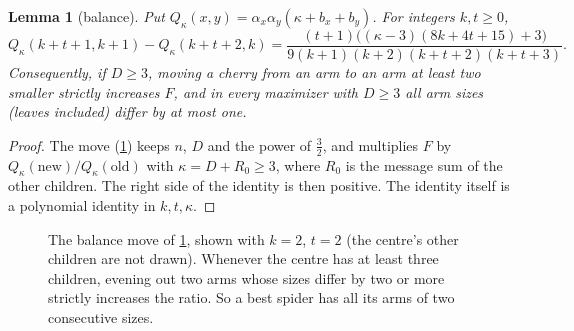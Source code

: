 \documentclass[11pt]{article}
\newtheorem{lemma}[theorem]{Lemma}
\theoremstyle{definition}
\begin{document}
\begin{lemma}[balance]\label{lem:balance}
Put $Q_\kappa(x,y)=\alpha_x\alpha_y(\kappa+b_x+b_y)$. For integers $k,t\ge0$,
\[
  Q_\kappa(k+t+1,k+1)-Q_\kappa(k+t+2,k)=\frac{(t+1)\big((\kappa-3)(8k+4t+15)+3\big)}{9(k+1)(k+2)(k+t+2)(k+t+3)}.
\]
Consequently, if $D\ge3$, moving a cherry from an arm to an arm at least two smaller strictly increases
$F$, and in every maximizer with $D\ge3$ all arm sizes (leaves included) differ by at most one.
\end{lemma}

\begin{proof}
The move (\cref{fig:balance}) keeps $n$, $D$ and the power of $\tfrac32$, and multiplies $F$ by
$Q_\kappa(\text{new})/Q_\kappa(\text{old})$ with $\kappa=D+R_0\ge3$, where $R_0$ is the message sum of the
other children. The right side of the identity is then positive. The identity itself is a polynomial
identity in $k,t,\kappa$.
\end{proof}

\begin{figure}[htbp]\centering
{}
\caption{The balance move of \cref{lem:balance}, shown with $k=2$, $t=2$ (the centre's other children
are not drawn). Whenever the centre has at least three children, evening out two arms whose sizes differ
by two or more strictly increases the ratio. So a best spider has all its arms of two consecutive sizes.}
\label{fig:balance}
\end{figure}
\end{document}
